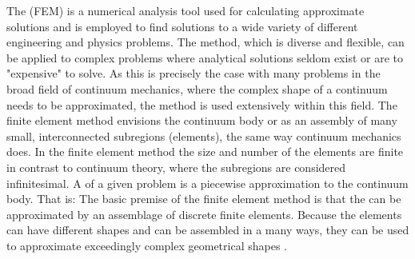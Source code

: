 
\label{sec:finite_element_method}
The  (FEM) is a numerical analysis tool
used for calculating approximate solutions and is employed to find
solutions to a wide variety of different engineering and physics
problems.
%
The method, which is diverse and flexible, can be applied to complex
problems where analytical solutions seldom exist or are to "expensive"
to solve. As this is precisely the case with many problems in the broad
field of continuum mechanics, where the complex shape of a continuum
needs to be approximated, the method is used extensively within this
field.
%
The finite element method envisions the continuum body or
 as an assembly of many small,
interconnected subregions (elements), the same way continuum mechanics
does.
In the finite element method the size and number of the elements are
finite in contrast to continuum theory, where the subregions are
considered infinitesimal.
A  of a given problem is a
piecewise approximation to the continuum body. That is: The basic
premise of the finite element method is that the  can be approximated by an assemblage of discrete finite
elements. Because the elements can have different shapes and can be
assembled in a many ways, they can be used to approximate exceedingly
complex geometrical shapes .

